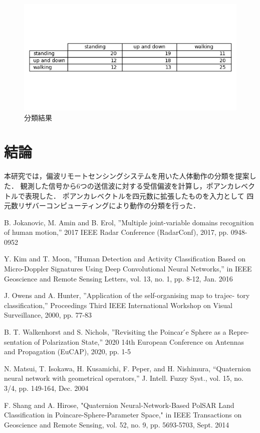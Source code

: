 \documentclass[uplatex,a4paper,12pt]{jsarticle}
\begin{document}
\begin{figure}[hbtp]
	\centering
	\includegraphics[scale=0.5]{../img/result_table7_hand.png}
    \caption{分類結果}
	\label{fig:class}
\end{figure}
\clearpage



\section{結論}
本研究では，偏波リモートセンシングシステムを用いた人体動作の分類を提案した．
観測した信号から6つの送信波に対する受信偏波を計算し，ポアンカレベクトルで表現した．
ポアンカレベクトルを四元数に拡張したものを入力として
四元数リザバーコンピューティングにより動作の分類を行った．

\begin{thebibliography}{99}
		
	 B. Jokanovic, M. Amin and B. Erol, ”Multiple joint-variable domains recognition of human motion,” 2017 IEEE Radar Conference (RadarConf), 2017, pp. 0948- 0952
	
     Y. Kim and T. Moon, ”Human Detection and Activity Classification Based on Micro-Doppler Signatures Using Deep Convolutional Neural Networks,” in IEEE Geoscience and Remote Sensing Letters, vol. 13, no. 1, pp. 8-12, Jan. 2016
	
     J. Owens and A. Hunter, ”Application of the self-organising map to trajec- tory classification,” Proceedings Third IEEE International Workshop on Visual Surveillance, 2000, pp. 77-83

     B. T. Walkenhorst and S. Nichols, ”Revisiting the Poincar ́e Sphere as a Repre- sentation of Polarization State,” 2020 14th European Conference on Antennas and Propagation (EuCAP), 2020, pp. 1-5
	
     N. Matsui, T. Isokawa, H. Kusamichi, F. Peper, and H. Nishimura,
    “Quaternion neural network with geometrical operators,” J. Intell. Fuzzy
    Syst., vol. 15, no. 3/4, pp. 149-164, Dec. 2004

     F. Shang and A. Hirose, "Quaternion Neural-Network-Based PolSAR Land Classification in Poincare-Sphere-Parameter Space," in IEEE Transactions on Geoscience and Remote Sensing, vol. 52, no. 9, pp. 5693-5703, Sept. 2014
	    

\end{thebibliography}
\end{document}
